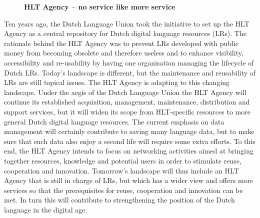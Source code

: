 \documentclass[10pt, a4paper, twopage, headinclude, footinclude, BCOR5mm]{book}
\begin{document}
\newpage

\begin{figure}[t!]
\centering
\large\textbf{HLT Agency – no service like more service}
\vspace*{0.5cm}
\end{figure}


\begin{table}[t!]
\end{table} 
\noindent
Ten years ago, the Dutch Language Union took the initiative to set up the HLT Agency as a central repository for Dutch digital language resources (LRs). The rationale behind the HLT Agency was to prevent LRs developed with public money from becoming obsolete and therefore useless and to enhance visibility, accessibility and re-usability by having one organisation managing the lifecycle of Dutch LRs.  Today’s landscape is different, but the maintenance and reusability of LRs are still topical issues. The HLT Agency is adapting to this changing landscape. Under the aegis of the Dutch Language Union the HLT Agency will continue its established acquisition, management, maintenance, distribution and support services, but it will widen its scope from HLT-specific resources to more general Dutch digital language resources. The current emphasis on data management will certainly contribute to saving many language data, but to make sure that such data also enjoy a second life will require some extra efforts. To this end, the HLT Agency intends to focus on networking activities aimed at bringing together resources, knowledge and potential users in order to stimulate reuse, cooperation and innovation.  Tomorrow’s landscape will thus include an HLT Agency that is still in charge of LRs, but which has a wider view and offers more services so that the prerequisites for reuse, cooperation and innovation can be met. In turn this will contribute to strengthening the position of the Dutch language in the digital age.  
\end{document}
